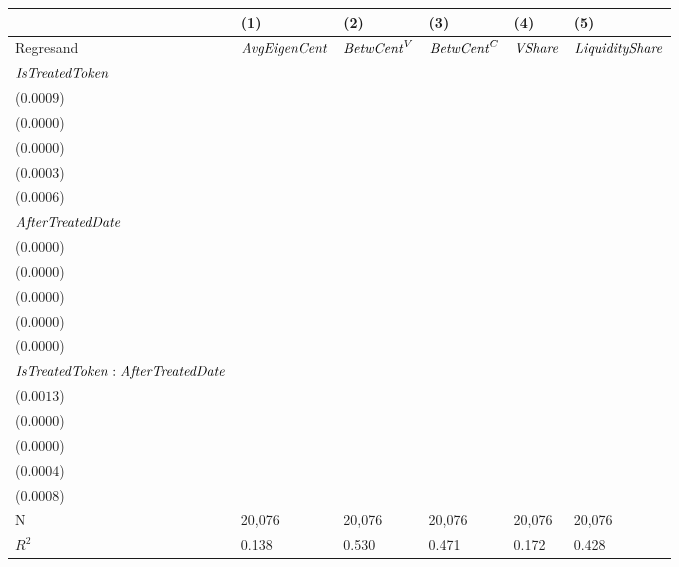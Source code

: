 \begin{tabular}{llllll}
\toprule
{} &                                      (1) &                                      (2) &                                      (3) &                                      (4) &                                       (5) \\
\midrule
Regresand                                     &                     ${\it AvgEigenCent}$ &                       ${\it BetwCent}^V$ &                       ${\it BetwCent}^C$ &                           ${\it VShare}$ &                    ${\it LiquidityShare}$ \\
${\it IsTreatedToken}$                        &  \makecell{$0.0316^{***}$ \\ ($0.0009$)} &  \makecell{$0.0027^{***}$ \\ ($0.0000$)} &  \makecell{$0.0010^{***}$ \\ ($0.0000$)} &  \makecell{$0.0109^{***}$ \\ ($0.0003$)} &   \makecell{$0.0488^{***}$ \\ ($0.0006$)} \\
${\it AfterTreatedDate}$                      &  \makecell{$0.0009^{***}$ \\ ($0.0000$)} &   \makecell{$0.0000^{**}$ \\ ($0.0000$)} &  \makecell{$0.0000^{***}$ \\ ($0.0000$)} &  \makecell{$0.0003^{***}$ \\ ($0.0000$)} &   \makecell{$0.0008^{***}$ \\ ($0.0000$)} \\
${\it IsTreatedToken}:{\it AfterTreatedDate}$ &  \makecell{$0.0052^{***}$ \\ ($0.0013$)} &  \makecell{$0.0006^{***}$ \\ ($0.0000$)} &  \makecell{$0.0002^{***}$ \\ ($0.0000$)} &  \makecell{$0.0035^{***}$ \\ ($0.0004$)} &  \makecell{$-0.0047^{***}$ \\ ($0.0008$)} \\
\midrule N                                    &                                   20,076 &                                   20,076 &                                   20,076 &                                   20,076 &                                    20,076 \\
$R^2$                                         &                                    0.138 &                                    0.530 &                                    0.471 &                                    0.172 &                                     0.428 \\
\bottomrule
\end{tabular}
